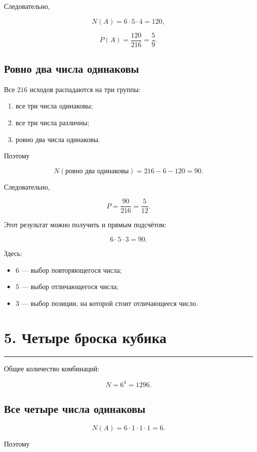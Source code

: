 \documentclass[a4paper,12pt]{article}
\newcommand{\sectionline}{%
    \vspace{0.2em}
    {\color{accent}\rule{\linewidth}{0.7pt}}
    \vspace{0.4em}
}
\begin{document}
Следовательно,

\[
N(A)=6\cdot5\cdot4=120,
\]

\[
\boxed{
P(A)=\frac{120}{216}=\frac59
}.
\]

\subsection*{Ровно два числа одинаковы}

Все \(216\) исходов распадаются на три группы:

\begin{enumerate}[leftmargin=1.7em]
    \item все три числа одинаковы;
    \item все три числа различны;
    \item ровно два числа одинаковы.
\end{enumerate}

Поэтому

\[
N(\text{ровно два одинаковы})
=
216-6-120=90.
\]

Следовательно,

\[
\boxed{
P=\frac{90}{216}=\frac5{12}
}.
\]

Этот результат можно получить и прямым подсчётом:

\[
6\cdot5\cdot3=90.
\]

Здесь:

\begin{itemize}[leftmargin=1.5em]
    \item \(6\) --- выбор повторяющегося числа;
    \item \(5\) --- выбор отличающегося числа;
    \item \(3\) --- выбор позиции, на которой стоит отличающееся число.
\end{itemize}

\section*{5. Четыре броска кубика}
\sectionline

Общее количество комбинаций:

\[
N=6^4=1296.
\]

\subsection*{Все четыре числа одинаковы}

\[
N(A)=6\cdot1\cdot1\cdot1=6.
\]

Поэтому
\end{document}
